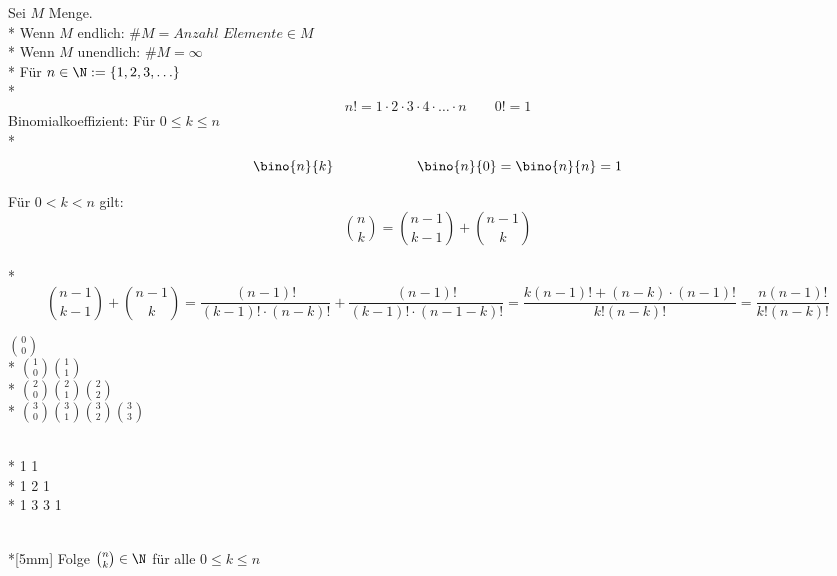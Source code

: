 %
\wdh
Sei $M$ Menge.\\*
Wenn $M$ endlich: $\#M=Anzahl$ $Elemente\in M$\\*
Wenn $M$ unendlich: $\#M=\infty$\\*
Für $n\in \N:=\{1,2,3,\ldots\}$\\*
$$n!=1 · 2 · 3 · 4 · … · n \qquad 0!=1$$
Binomialkoeffizient: Für $0\leq k\leq n$\\*
$$\bino{n}{k} \qquad\qquad\qquad \bino{n}{0}=\bino{n}{n}=1$$

Für $0<k< n$ gilt:
$$\binom{n}{k} = \binom{n -1}{k-1} + \binom{n-1}{k}$$\\*
%
\bew 
$$\binom{n-1}{k-1}+ \binom{n-1}{k}=\frac{(n-1)!}{(k-1)!·(n-k)!} +\frac{(n-1)!}{(k-1)!·(n-1-k)!} = \frac{k(n-1)!+(n-k)\cdot(n-1)!}{k! (n-k)!}=\frac{n(n-1)!}{k!(n-k)!}$$

\parbox{0.4\textwidth}{\centering
$\binom{0}{0}$\\*
$\binom{1}{0} \binom{1}{1}$\\*
$\binom{2}{0} \binom{2}{1} \binom{2}{2}$\\*
$\binom{3}{0} \binom{3}{1} \binom{3}{2} \binom{3}{3}$}\hfill
\parbox{0.4\textwidth}{\\*
1 1\\*
1 2 1\\*
1 3 3 1}\\*[5mm]
Folge $\binom{n}{k}\in \N$ für alle $0\leq k\leq n$
%

